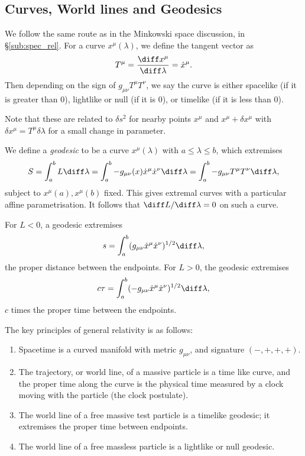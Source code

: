 \documentclass[12pt]{article}
\begin{document}
\subsection{Curves, World lines and Geodesics}
\label{sub:cur_wor_geo}

We follow the same route as in the Minkowski space discussion, in \S\ref{sub:spec_rel}. For a curve $x^\mu(\lambda)$, we define the tangent vector as
\[
T^\mu = \frac{\diff x^\mu}{\diff \lambda} = \dot x^\mu.
\]
Then depending on the sign of $g_{\mu \nu} T^\mu T^\nu$, we say the curve is either spacelike (if it is greater than 0), lightlike or null (if it is 0), or timelike (if it is less than 0).

Note that these are related to $\delta s^2$ for nearby points $x^\mu$ and $x^\mu + \delta x^\mu$ with $\delta x^\mu = T^\mu \delta \lambda$ for a small change in parameter.

We define a \emph{geodesic} to be a curve $x^\mu(\lambda)$ with $a \leq \lambda \leq b$, which extremises
\[
S = \int_a^b L \diff \lambda = \int_a^b - g_{\mu \nu}(x) \dot x^\mu \dot x^\nu \diff \lambda = \int_a^b -g_{\mu \nu} T^\mu T^\nu \diff \lambda,
\]
subject to $x^\mu(a), x^\mu(b)$ fixed. This gives extremal curves with a particular affine parametrisation. It follows that $\diff L/\diff \lambda = 0$ on such a curve.

For $L < 0$, a geodesic extremises
\[
s = \int_a^b (g_{\mu \nu} \dot x^\mu \dot x^\nu)^{1/2} \diff \lambda,
\]
the proper distance between the endpoints. For $L > 0$, the geodesic extremises
\[
c \tau = \int_a^b (- g_{\mu \nu}\dot x^\mu \dot x^\nu)^{1/2} \diff \lambda,
\]
$c$ times the proper time between the endpoints.

The key principles of general relativity is as follows:
\begin{enumerate}
	\item Spacetime is a curved manifold with metric $g_{\mu \nu}$, and signature $(-, +, +, +)$.
	\item The trajectory, or world line, of a massive particle is a time like curve, and the proper time along the curve is the physical time measured by a clock moving with the particle (the clock postulate).
	\item The world line of a free massive test particle is a timelike geodesic; it extremises the proper time between endpoints.
	\item The world line of a free massless particle is a lightlike or null geodesic.
\end{enumerate}
\end{document}
